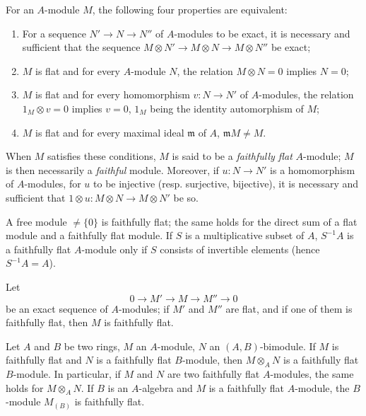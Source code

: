 \begin{env}[6.4.1]
\label{0.6.4.1}
For an $A$-module $M$, the following four properties are equivalent:
\begin{enumerate}
  \item[$a)$] For a sequence $N'\to N\to N''$ of $A$-modules to be exact,
    it is necessary and sufficient that the sequence
    $M\otimes N'\to M\otimes N\to M\otimes N''$ be exact;
  \item[$b)$] $M$ is flat and for every $A$-module $N$, the relation
    $M\otimes N=0$ implies $N=0$;
  \item[$c)$] $M$ is flat and for every homomorphism $v:N\to N'$ of
    $A$-modules, the relation $1_M\otimes v=0$ implies $v=0$, $1_M$ being
    the identity automorphism of $M$;
  \item[$d)$] $M$ is flat and for every maximal ideal $\mathfrak{m}$ of
    $A$, $\mathfrak{m}M\neq M$.
\end{enumerate}

When $M$ satisfies these conditions, $M$ is said to be a \emph{faithfully flat}
$A$-module; $M$ is then necessarily a \emph{faithful}
module. Moreover, if $u:N\to N'$ is a homomorphism of $A$-modules,
for $u$ to be injective (resp. surjective, bijective), it is necessary and sufficient
that $1\otimes u:M\otimes N\to M\otimes N'$ be so.
\end{env}


\begin{env}[6.4.2]
\label{0.6.4.2}
A free module $\neq\{0\}$ is faithfully flat; the same holds for the
direct sum of a flat module and a faithfully flat module. If $S$ is
a multiplicative subset of $A$, $S^{-1}A$ is a faithfully flat $A$-module
only if $S$ consists of invertible elements (hence $S^{-1}A=A$).
\end{env}

\begin{env}[6.4.3]
\label{0.6.4.3}
Let
\[
  0\longrightarrow M'\longrightarrow M\longrightarrow M''\longrightarrow 0
\]
be an exact sequence of $A$-modules; if $M'$ and $M''$ are flat, and if one
of them is faithfully flat, then $M$ is faithfully flat.
\end{env}

\begin{env}[6.4.4]
\label{0.6.4.4}
Let $A$ and $B$ be two rings, $M$ an $A$-module, $N$ an
$(A,B)$-bimodule. If $M$ is faithfully flat and $N$ is a faithfully flat
$B$-module, then $M\otimes_A N$ is a faithfully flat $B$-module. In
particular, if $M$ and $N$ are two faithfully flat $A$-modules, the same
holds for $M\otimes_A N$. If $B$ is an $A$-algebra and $M$ is a
faithfully flat $A$-module, the $B$-module $M_{(B)}$ is faithfully flat.
\end{env}

